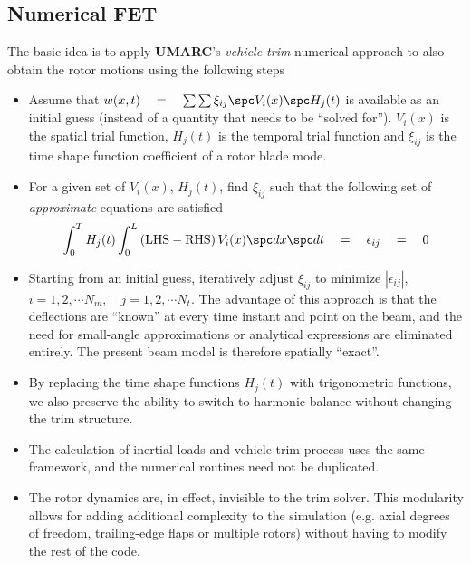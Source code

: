 \subsection{\textbf{Numerical FET}}
The basic idea is to apply \textbf{UMARC}'s \textit{vehicle trim} numerical approach to also obtain the rotor motions using the following steps
\begin{itemize}
\item Assume that $w(x,t) \quad = \quad \sum \sum \xi_{ij} \spc V_i(x) \spc H_j(t)$ is available as an initial guess (instead of a quantity that needs to be ``solved for''). $V_i(x)$ is the spatial trial function, $H_j(t)$ is the temporal trial function and $\xi_{ij}$  is the time shape function coefficient of a rotor blade mode. 
\item For a given set of $V_i(x)$, $H_j(t)$, find $\xi_{ij}$ such that the following set of \textit{approximate} equations are satisfied
\begin{equation}
\int_0^T H_j(t) \int_0^L \left(\textrm{LHS} - \textrm{RHS}\right) V_i(x) \spc dx \spc dt \quad = \quad  \epsilon_{ij} \quad = \quad 0
\end{equation}
\item Starting from an initial guess, iteratively adjust $\xi_{ij}$ to minimize $|\epsilon_{ij}|$, $i = 1, 2, \cdots N_m, \quad j = 1, 2, \cdots N_t$. The advantage of this approach is that the deflections are ``known'' at every time instant and point on the beam, and the need for small-angle approximations or analytical expressions are eliminated entirely. The present beam model is therefore spatially ``exact''.
\item By replacing the time shape functions $H_j(t)$ with trigonometric functions, we also preserve the ability to switch to harmonic balance without changing the trim structure.
\item The calculation of inertial loads and vehicle trim process uses the same framework, and the numerical routines need not be duplicated. 
\item The rotor dynamics are, in effect, invisible to the trim solver. This modularity allows for adding additional complexity to the simulation (e.g. axial degrees of freedom, trailing-edge flaps or multiple rotors) without having to modify the rest of the code.
\end{itemize}

